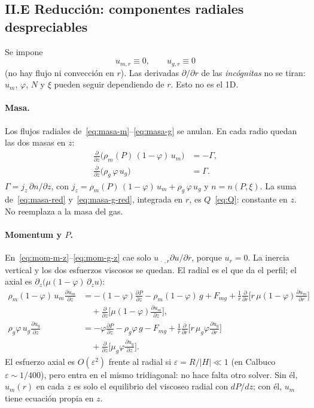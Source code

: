 \documentclass[11pt,a4paper]{article}
\newcommand{\p}{\partial}
\begin{document}
\subsection*{II.E Reducción: componentes radiales despreciables}

Se impone
\[
u_{m,r}\equiv 0,
\qquad
u_{g,r}\equiv 0
\]
(no hay flujo ni convección en $r$). Las derivadas
$\p/\p r$ de las \emph{incógnitas} no se tiran: $u_m$,
$\varphi$, $N$ y $\xi$ pueden seguir dependiendo de $r$.
Esto no es el 1D.

\paragraph{Masa.}
Los flujos radiales de~\eqref{eq:masa-m}--\eqref{eq:masa-g}
se anulan. En cada radio quedan las dos masas en $z$:
\begin{align}
\label{eq:masa-red}
\frac{\p}{\p z}\bigl(\rho_m(P)\,(1-\varphi)\,u_m\bigr)
&=-\Gamma,
\\
\label{eq:masa-g-red}
\frac{\p}{\p z}\bigl(\rho_g\,\varphi\,u_g\bigr)
&=\Gamma.
\end{align}
$\Gamma=j_z\,\p n/\p z$, con
$j_z=\rho_m(P)\,(1-\varphi)\,u_m+\rho_g\,\varphi\,u_g$
y $n=n(P,\xi)$. La suma de~\eqref{eq:masa-red}
y~\eqref{eq:masa-g-red}, integrada en $r$, es
$Q$~\eqref{eq:Q}: constante en $z$. No reemplaza a la
masa del gas.

\paragraph{Momentum y $P$.}
En~\eqref{eq:mom-m-z}--\eqref{eq:mom-g-z} cae solo
$u_{\,\cdot\,,r}\p u/\p r$, porque $u_r=0$. La inercia
vertical y los dos esfuerzos viscosos se quedan. El radial
es el que da el perfil; el axial es
$\p_z\bigl(\mu(1-\varphi)\,\p_z u\bigr)$:
\begin{align}
\label{eq:mom-red}
\rho_m(1-\varphi)\,u_m\frac{\p u_m}{\p z}
&=
-(1-\varphi)\frac{\p P}{\p z}
-\rho_m(1-\varphi)\,g
+F_{mg}
+\frac{1}{r}\frac{\p}{\p r}\Biggl[
r\,\mu(1-\varphi)\frac{\p u_m}{\p r}
\Biggr]
\nonumber\\
&\quad
+\frac{\p}{\p z}\Biggl[
\mu(1-\varphi)\frac{\p u_m}{\p z}
\Biggr],
\\
\rho_g\varphi\,u_g\frac{\p u_g}{\p z}
&=
-\varphi\frac{\p P}{\p z}
-\rho_g\varphi\,g
-F_{mg}
+\frac{1}{r}\frac{\p}{\p r}\Biggl[
r\,\mu_g\varphi\frac{\p u_g}{\p r}
\Biggr]
\nonumber\\
&\quad
+\frac{\p}{\p z}\Biggl[
\mu_g\varphi\frac{\p u_g}{\p z}
\Biggr].
\end{align}
El esfuerzo axial es $O(\varepsilon^2)$ frente al radial si
$\varepsilon=R/|H|\ll 1$ (en Calbuco $\varepsilon\sim 1/400$),
pero entra en el mismo tridiagonal: no hace falta otro
solver. Sin él, $u_m(r)$ en cada $z$ es solo el equilibrio
del viscoseo radial con $dP/dz$; con él, $u_m$ tiene
ecuación propia en $z$.
\end{document}
